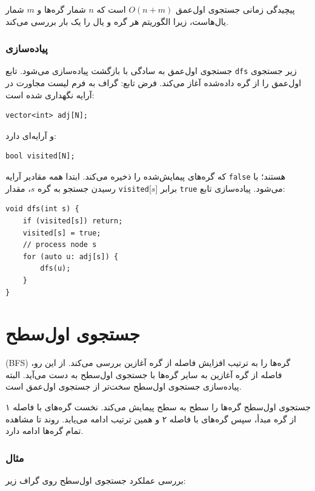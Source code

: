 پیچیدگی زمانی جستجوی اول‌عمق $O(n+m)$ است
که $n$ شمار گره‌ها و $m$ شمار
یال‌هاست،
زیرا الگوریتم هر گره و یال را یک بار بررسی می‌کند.

\subsubsection*{پیاده‌سازی}

جستجوی اول‌عمق به سادگی
با بازگشت پیاده‌سازی می‌شود.
تابع \texttt{dfs} زیر جستجوی اول‌عمق
را از گره داده‌شده آغاز می‌کند.
فرض تابع: گراف
به فرم لیست مجاورت در آرایه نگهداری شده است:
\begin{lstlisting}
vector<int> adj[N];
\end{lstlisting}
و آرایه‌ای دارد:
\begin{lstlisting}
bool visited[N];
\end{lstlisting}
که گره‌های پیمایش‌شده را ذخیره می‌کند.
ابتدا همه مقادیر آرایه \texttt{false} هستند؛
با رسیدن جستجو به گره $s$،
مقدار \texttt{visited}[$s$] برابر \texttt{true} می‌شود.
پیاده‌سازی تابع:
\begin{lstlisting}
void dfs(int s) {
    if (visited[s]) return;
    visited[s] = true;
    // process node s
    for (auto u: adj[s]) {
        dfs(u);
    }
}
\end{lstlisting}

\section{جستجوی اول‌سطح}


 (BFS) گره‌ها را
به ترتیب افزایش فاصله از گره آغازین
بررسی می‌کند.
از این رو، فاصله از گره آغازین
به سایر گره‌ها با جستجوی اول‌سطح
به دست می‌آید.
البته پیاده‌سازی جستجوی اول‌سطح
سخت‌تر از جستجوی اول‌عمق است.

جستجوی اول‌سطح گره‌ها را
سطح به سطح پیمایش می‌کند.
نخست گره‌های با فاصله ۱
از گره مبدأ،
سپس گره‌های با فاصله ۲ و همین ترتیب ادامه می‌یابد.
روند تا مشاهده تمام گره‌ها
ادامه دارد.

\subsubsection*{مثال}

بررسی عملکرد جستجوی اول‌سطح
روی گراف زیر:

